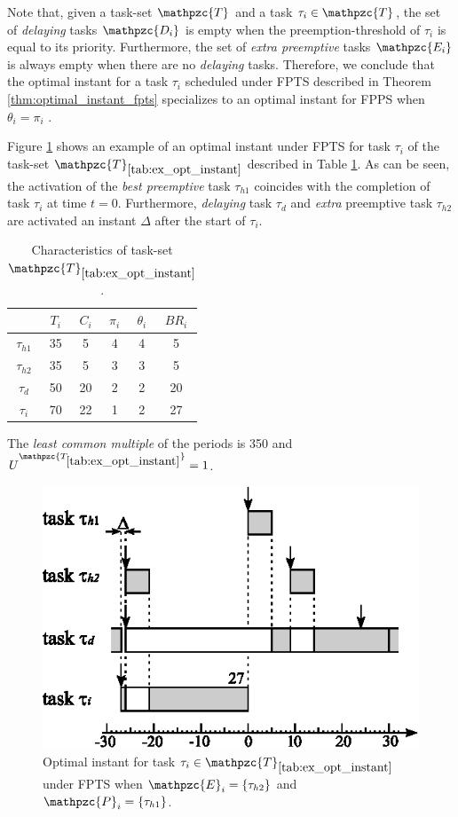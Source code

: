 \documentclass[fleqn]{article}
\begin{document}
Note that, given a task-set $\mathpzc{T}$ and a task $\tau_i \in \mathpzc{T}$, the set of \textit{delaying} tasks $\mathpzc{D_i}$ is empty when the preemption-threshold of $\tau_i$ is equal to its priority. Furthermore, the set of \textit{extra preemptive} tasks $\mathpzc{E_i}$ is always empty when there are no \textit{delaying} tasks. Therefore, we conclude that the optimal instant for a task $\tau_i$ scheduled under FPTS described in Theorem \ref{thm:optimal_instant_fpts} specializes to an optimal instant for FPPS when $\theta_i = \pi_i$ . 

Figure \ref{fig:optimal_instant} shows an example of an optimal instant under FPTS for task $\tau_i$ of the task-set $\mathpzc{T}_{\ref{tab:ex_opt_instant}}$ described in Table \ref{tab:ex_opt_instant}. As can be seen, the activation of the \textit{best preemptive} task $\tau_{h1}$ coincides with the completion of task $\tau_i$ at time $t=0$. Furthermore, \textit{delaying} task $\tau_d$ and \textit{extra} preemptive task $\tau_{h2}$ are activated an instant $\Delta$ after the start of $\tau_i$.

\begin{table}[H]
	\center
	\caption{Characteristics of task-set $\mathpzc{T}_{\ref{tab:ex_opt_instant}}$.}
	\label{tab:ex_opt_instant}
	\begin{tabular}{c c c c c | c}
		\hline 
		& $T_i$ & $C_i$ & $\pi_i$ & $\theta_i$ & $BR_i$\\ 
		\hline 
		$\tau_{h1}$& 35 & 5  & 4 & 4 & 5\\ 
		$\tau_{h2}$& 35 & 5  & 3 & 3 & 5\\ 
		$\tau_d$& 50 & 20 & 2 & 2 & 20\\ 
		$\tau_i$& 70 & 22 & 1 & 2 & 27\\
		\hline 
	\end{tabular}
	\small
	\item The \textit{least common multiple} of the periods is 350 and $U^{\mathpzc{T_{\ref{tab:ex_opt_instant}}}}=1$.
\end{table}

\begin{figure}[H]
	\centering
	\includegraphics[width=0.55\linewidth]{figures/optimal_instant1}
	\caption{Optimal instant for task $\tau_i\in \mathpzc{T}_{\ref{tab:ex_opt_instant}}$ under FPTS when $\mathpzc{E}_i = \{\tau_{h2}\}$ and $\mathpzc{P}_i = \{\tau_{h1}\}$. }
	\label{fig:optimal_instant}
\end{figure}
\end{document}
